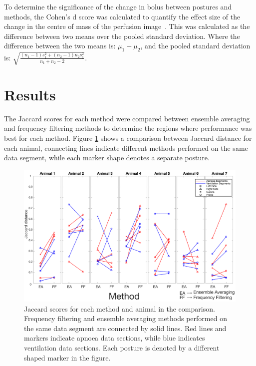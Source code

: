 To determine the significance of the change in bolus between postures
and methods, the Cohen's d score was calculated to quantify the effect size of
the change in the centre of mass of the perfusion image~\parencite{cohen_statistical_1977}.  
This was calculated as the difference between two means over the pooled standard deviation. 
Where the difference between the two means is: $\mu_1-\mu_2$, and the pooled
standard deviation is: ${\sqrt{\frac{(n_1-1)s^2_1+(n_2-1)n_2s^2_1}{n_1+n_2-2}}}$. 

\section{Results}                         %

The Jaccard scores for each method were compared between 
ensemble averaging and frequency filtering methods to determine the regions where performance 
was best for each method. Figure \ref{fig:resultsJaccard} shows a 
comparison between Jaccard distance for each animal, connecting lines 
indicate different methods performed on the same data segment, while each marker shape
denotes a separate posture.

\begin{figure}
\centering
\includegraphics[width=\textwidth]{chapter3-perfusion_analysis/imgs/fig-resultsJaccard.pdf}
\caption[Jaccard index scores]{\label{fig:resultsJaccard}%
Jaccard scores for each method and animal in the comparison. Frequency 
filtering and ensemble averaging methods performed on the same data segment are 
connected by solid lines. Red lines and markers indicate apnoea data sections, 
while blue indicates ventilation data sections. Each posture is denoted by a different
shaped marker in the figure.
}
\end{figure}

